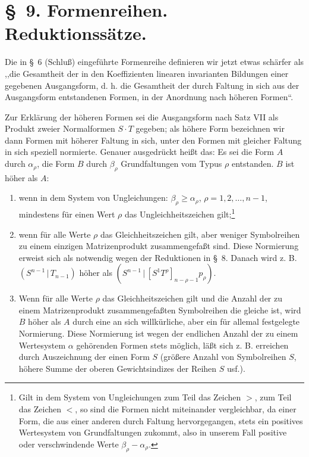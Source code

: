 \documentclass[11pt]{article}
\providecommand{\pair}[2]{(#1\,|\,#2)}
\begin{document}
\section*{\S\ 9. Formenreihen. Reduktionss\"atze.}
Die in \S\ 6 (Schlu\ss) eingef\"uhrte Formenreihe definieren wir jetzt etwas sch\"arfer als ,,die Gesamtheit der in den Koeffizienten linearen invarianten Bildungen einer gegebenen Ausgangsform, d. h. die Gesamtheit der durch Faltung in sich aus der Ausgangsform entstandenen Formen, in der Anordnung nach h\"oheren Formen``.

Zur Erkl\"arung der h\"oheren Formen sei die Ausgangsform nach Satz VII als Produkt zweier Normalformen $S\cdot T$ gegeben; als h\"ohere Form bezeichnen wir dann Formen mit h\"oherer Faltung in sich, unter den Formen mit gleicher Faltung in sich speziell normierte. Genauer ausgedr\"uckt hei\ss t das: Es sei die Form $A$ durch $\alpha_\rho$, die Form $B$ durch $\beta_\rho$ Grundfaltungen vom Typus $\rho$ entstanden. $B$ ist h\"oher als $A$:
\begin{enumerate}
\item wenn in dem System von Ungleichungen: $\beta_\rho\ge\alpha_\rho$, $\rho=1,2,\ldots,n-1$, mindestens f\"ur einen Wert $\rho$ das Ungleichheitszeichen gilt;\footnote{Gilt in dem System von Ungleichungen zum Teil das Zeichen $>$, zum Teil das Zeichen $<$, so sind die Formen nicht miteinander vergleichbar, da einer Form, die aus einer anderen durch Faltung hervorgegangen, stets ein positives Wertesystem von Grundfaltungen zukommt, also in unserem Fall positive oder verschwindende Werte $\beta_\rho-\alpha_\rho$.}
\item wenn f\"ur alle Werte $\rho$ das Gleichheitszeichen gilt, aber weniger Symbolreihen zu einem einzigen Matrizenprodukt zusammengefa\ss t sind. Diese Normierung erweist sich als notwendig wegen der Reduktionen in \S\ 8. Danach wird z. B. $\pair{S^{n-1}}{T_{n-1}}$ h\"oher als $\pair{S^{n-1}}{[S^1T^\rho]_{n-\rho-1}p_\rho}$.
\item Wenn f\"ur alle Werte $\rho$ das Gleichheitszeichen gilt und die Anzahl der zu einem Matrizenprodukt zusammengefa\ss ten Symbolreihen die gleiche ist, wird $B$ h\"oher als $A$ durch eine an sich willk\"urliche, aber ein f\"ur allemal festgelegte Normierung. Diese Normierung ist wegen der endlichen Anzahl der zu einem Wertesystem $\alpha$ geh\"orenden Formen stets m\"oglich, l\"a\ss t sich z. B. erreichen durch Auszeichnung der einen Form $S$ (gr\"o\ss ere Anzahl von Symbolreihen $S$, h\"ohere Summe der oberen Gewichtsindizes der Reihen $S$ usf.).
\end{enumerate}
\end{document}

